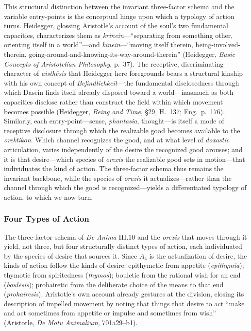 \documentclass{article}
\begin{document}
This structural distinction between the invariant three-factor schema and the variable entry-points is the conceptual hinge upon which a typology of action turns. Heidegger, glossing Aristotle's account of the soul's two fundamental capacities, characterizes them as \textit{krinein}---``separating from something other, orienting itself in a world''---and \textit{kinein}---``moving itself therein, being-involved-therein, going-around-and-knowing-its-way-around-therein'' (Heidegger, \textit{Basic Concepts of Aristotelian Philosophy}, p.~37). The receptive, discriminating character of \textit{aisthēsis} that Heidegger here foregrounds bears a structural kinship with his own concept of \textit{Befindlichkeit}---the fundamental disclosedness through which Dasein finds itself already disposed toward a world---inasmuch as both capacities disclose rather than construct the field within which movement becomes possible (Heidegger, \textit{Being and Time}, \S29, H.~137; Eng.~p.~176). Similarly, each entry-point---sense, \textit{phantasia}, thought---is itself a mode of receptive disclosure through which the realizable good becomes available to the \textit{orektikon}. Which channel recognizes the good, and at what level of \textit{doxastic} articulation, varies independently of the desire the recognized good arouses; and it is that desire---which species of \textit{orexis} the realizable good sets in motion---that individuates the kind of action. The three-factor schema thus remains the invariant backbone, while the species of \textit{orexis} it actualizes---rather than the channel through which the good is recognized---yields a differentiated typology of action, to which we now turn.


\subsubsection*{Four Types of Action}

The three-factor schema of \textit{De Anima} III.10 and the \textit{orexis} that moves through it yield, not three, but four structurally distinct types of action, each individuated by the species of desire that sources it. Since $A_4$ is the actualization of desire, the kinds of action follow the kinds of desire: epithymetic from appetite (\textit{epithymia}); thymotic from spiritedness (\textit{thymos}); bouletic from the rational wish for an end (\textit{boulēsis}); prohairetic from the deliberate choice of the means to that end (\textit{prohairesis}). Aristotle's own account already gestures at the division, closing its description of impelled movement by noting that things that desire to act ``make and act sometimes from appetite or impulse and sometimes from wish'' (Aristotle, \textit{De Motu Animalium}, 701a29--b1).
\end{document}

